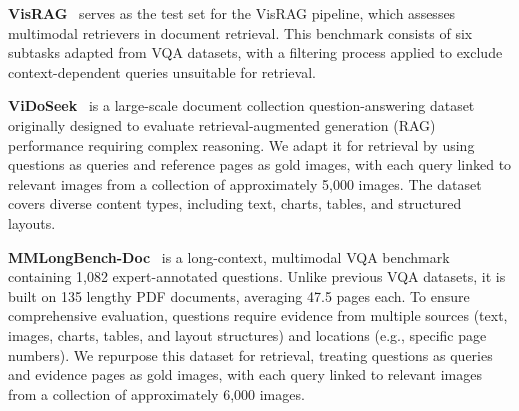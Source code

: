\textbf{VisRAG}~\citep{visrag} serves as the test set for the VisRAG pipeline, which assesses multimodal retrievers in document retrieval. This benchmark consists of six subtasks adapted from VQA datasets, with a filtering process applied to exclude context-dependent queries unsuitable for retrieval.

\textbf{ViDoSeek}~\citep{vidorag} is a large-scale document collection question-answering dataset originally designed to evaluate retrieval-augmented generation (RAG) performance requiring complex reasoning. We adapt it for retrieval by using questions as queries and reference pages as gold images, with each query linked to relevant images from a collection of approximately 5,000 images. The dataset covers diverse content types, including text, charts, tables, and structured layouts.

\textbf{MMLongBench-Doc}~\citep{mmlongbench} is a long-context, multimodal VQA benchmark containing 1,082 expert-annotated questions. Unlike previous VQA datasets, it is built on 135 lengthy PDF documents, averaging 47.5 pages each. To ensure comprehensive evaluation, questions require evidence from multiple sources (text, images, charts, tables, and layout structures) and locations (e.g., specific page numbers). We repurpose this dataset for retrieval, treating questions as queries and evidence pages as gold images, with each query linked to relevant images from a collection of approximately 6,000 images.






